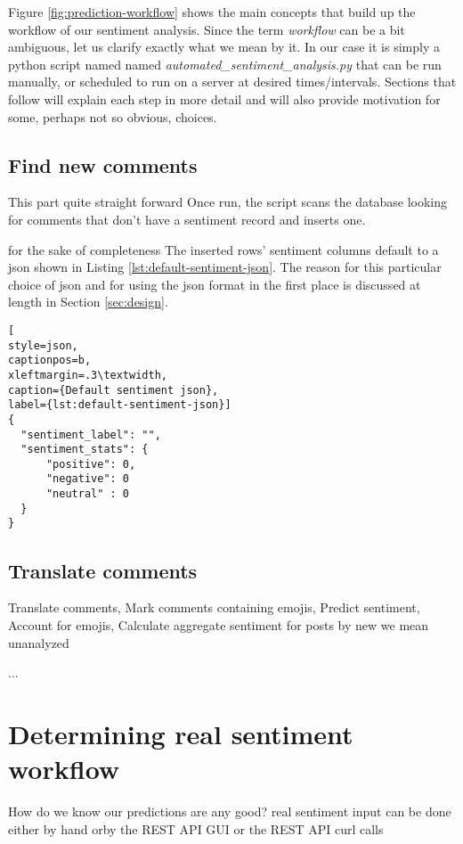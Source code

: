 

Figure \ref{fig:prediction-workflow} shows the main concepts that build up the workflow of our sentiment analysis. 
Since the term \textit{workflow} can be a bit ambiguous, let us clarify exactly what we mean by it. In our case it is simply a python script named named \textit{automated\_sentiment\_analysis.py} that can be run manually, or scheduled to run on a server at desired times/intervals. 
Sections that follow will explain each step in more detail and will also provide motivation for some, perhaps not so obvious, choices.


\subsection*{Find new comments\label{sec:find-new-comments}}
This part  quite straight forward 
 Once run, the script scans the database looking for comments that don't have a sentiment record and inserts one.  

 for the sake of completeness
The inserted rows' sentiment columns default to a json shown in Listing \ref{lst:default-sentiment-json}. The reason for this particular choice of json and for using the json format in the first place is discussed at length in Section \ref{sec:design}.

\begin{lstlisting}[
style=json,
captionpos=b,
xleftmargin=.3\textwidth,
caption={Default sentiment json},
label={lst:default-sentiment-json}]
{
  "sentiment_label": "",
  "sentiment_stats": {
      "positive": 0,
      "negative": 0
      "neutral" : 0
  }
}
\end{lstlisting}
\subsection*{Translate comments \label{sec:translate-comments}}
        Translate comments,{}
        Mark comments containing emojis, 
        Predict sentiment,
		Account for emojis, 
        Calculate aggregate sentiment for posts
by new we mean unanalyzed

...


\section{Determining real sentiment workflow\label{sec:determining-real-sentiment-workflow}}
How do we know our predictions are any good?
real sentiment input can be done either by hand orby the REST API GUI or the REST API curl calls


